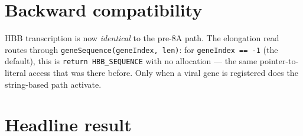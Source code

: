\documentclass[11pt,letterpaper,twoside,openany]{book}
\newcommand{\code}[1]{\texttt{#1}}
\begin{document}
\section{Backward compatibility}

HBB transcription is now \emph{identical} to the pre-8A path. The
elongation read routes through \code{geneSequence(geneIndex, len)}:
for \code{geneIndex == -1} (the default), this is
\code{return HBB\_SEQUENCE} with no allocation --- the same
pointer-to-literal access that was there before. Only when a viral
gene is registered does the string-based path activate.

\section{Headline result}
\end{document}
